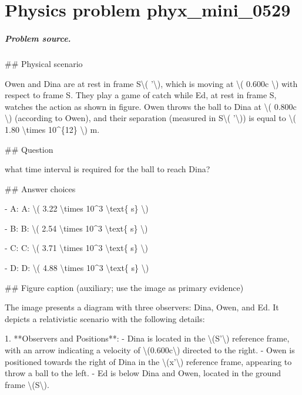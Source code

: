 
\chapter{Physics problem phyx\_mini\_0529}
\label{ch:PhyXMiniProblems_problem_phyx_mini_0529}

\paragraph{Problem source.}
\#\# Physical scenario

Owen and Dina are at rest in frame S\textbackslash{}( '\textbackslash{}), which is moving at \textbackslash{}( 0.600c \textbackslash{}) with respect to frame S. They play a game of catch while Ed, at rest in frame S, watches the action as shown in figure. Owen throws the ball to Dina at \textbackslash{}( 0.800c \textbackslash{}) (according to Owen), and their separation (measured in S\textbackslash{}( '\textbackslash{})) is equal to \textbackslash{}( 1.80 \textbackslash{}times 10\textasciicircum{}\{12\} \textbackslash{}) m.

\#\# Question

what time interval is required for the ball to reach Dina?

\#\# Answer choices

- A: A: \textbackslash{}( 3.22 \textbackslash{}times 10\textasciicircum{}3 \textbackslash{}text\{ s\} \textbackslash{})

- B: B: \textbackslash{}( 2.54 \textbackslash{}times 10\textasciicircum{}3 \textbackslash{}text\{ s\} \textbackslash{})

- C: C: \textbackslash{}( 3.71 \textbackslash{}times 10\textasciicircum{}3 \textbackslash{}text\{ s\} \textbackslash{})

- D: D: \textbackslash{}( 4.88 \textbackslash{}times 10\textasciicircum{}3 \textbackslash{}text\{ s\} \textbackslash{})

\#\# Figure caption (auxiliary; use the image as primary evidence)

The image presents a diagram with three observers: Dina, Owen, and Ed. It depicts a relativistic scenario with the following details:

1. **Observers and Positions**:
   - Dina is located in the \textbackslash{}(S'\textbackslash{}) reference frame, with an arrow indicating a velocity of \textbackslash{}(0.600c\textbackslash{}) directed to the right.
   - Owen is positioned towards the right of Dina in the \textbackslash{}(x'\textbackslash{}) reference frame, appearing to throw a ball to the left.
   - Ed is below Dina and Owen, located in the ground frame \textbackslash{}(S\textbackslash{}).


